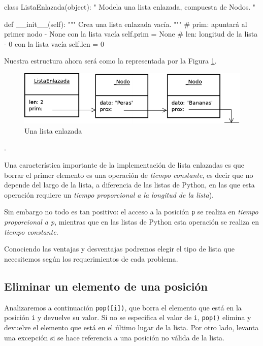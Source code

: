 \begin{codigo-python-sn}
class ListaEnlazada(object):
    " Modela una lista enlazada, compuesta de Nodos. "

    def __init__(self):
        """ Crea una lista enlazada vacía. """
        # prim: apuntará al primer nodo - None con la lista vacía
        self.prim = None
        # len: longitud de la lista - 0 con la lista vacía
        self.len = 0
\end{codigo-python-sn}

Nuestra estructura ahora será como la representada por la Figura
\ref{lista_enlazada}.

\begin{figure}[htb]
\label{lista_enlazada}
\includegraphics{graficos/16_ListaEnlazada}
\caption{Una lista enlazada}
\end{figure}

.

\begin{sabias_que}
Una característica importante de la implementación de lista enlazadas es que
borrar el primer elemento es una operación de {\it tiempo constante}, es
decir que no depende del largo de la lista, a diferencia de las listas de
Python, en las que esta operación requiere un {\it tiempo proporcional a la
longitud de la lista}).

Sin embargo no todo es tan positivo: el acceso a la posición {\tt p} se realiza
en {\it tiempo proporcional a p}, mientras que en las listas de Python esta
operación se realiza en {\it tiempo constante}.

Conociendo las ventajas y desventajas podremos elegir el tipo de lista que
necesitemos según los requerimientos de cada problema.
\end{sabias_que}

\subsection{Eliminar un elemento de una posición}

Analizaremos a continuación \lstinline|pop([i])|, que borra el elemento que
está en la posición \lstinline!i! y devuelve su valor. Si no se especifica
el valor de \lstinline!i!, \lstinline|pop()| elimina y devuelve el elemento
que está en el último lugar de la lista.  Por otro lado, levanta una
excepción si se hace referencia a una posición no válida de la lista.


